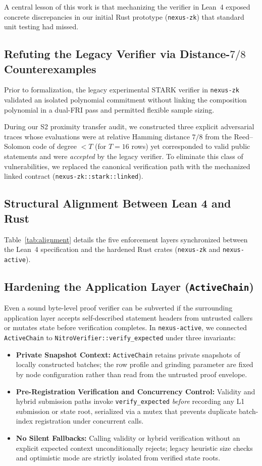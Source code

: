 \documentclass[conference]{IEEEtran}
\theoremstyle{definition}
\begin{document}
A central lesson of this work is that mechanizing the verifier in Lean~4 exposed concrete discrepancies in our initial Rust prototype (\texttt{nexus-zk}) that standard unit testing had missed.

\subsection{Refuting the Legacy Verifier via Distance-$7/8$ Counterexamples}
Prior to formalization, the legacy experimental STARK verifier in \texttt{nexus-zk} validated an isolated polynomial commitment without linking the composition polynomial in a dual-FRI pass and permitted flexible sample sizing.

During our S2 proximity transfer audit, we constructed three explicit adversarial traces whose evaluations were at relative Hamming distance $7/8$ from the Reed--Solomon code of degree $< T$ (for $T = 16$ rows) yet corresponded to valid public statements and were \emph{accepted} by the legacy verifier. To eliminate this class of vulnerabilities, we replaced the canonical verification path with the mechanized linked contract (\texttt{nexus-zk::stark::linked}).

\subsection{Structural Alignment Between Lean 4 and Rust}
Table~\ref{tab:alignment} details the five enforcement layers synchronized between the Lean~4 specification and the hardened Rust crates (\texttt{nexus-zk} and \texttt{nexus-active}).

\subsection{Hardening the Application Layer (\texttt{ActiveChain})}
Even a sound byte-level proof verifier can be subverted if the surrounding application layer accepts self-described statement headers from untrusted callers or mutates state before verification completes. In \texttt{nexus-active}, we connected \texttt{ActiveChain} to \texttt{NitroVerifier::verify\_expected} under three invariants:
\begin{itemize}
    \setlength{\itemsep}{2pt}
    \item \textbf{Private Snapshot Context:} \texttt{ActiveChain} retains private snapshots of locally constructed batches; the row profile and grinding parameter are fixed by node configuration rather than read from the untrusted proof envelope.
    \item \textbf{Pre-Registration Verification and Concurrency Control:} Validity and hybrid submission paths invoke \texttt{verify\_expected} \emph{before} recording any L1 submission or state root, serialized via a mutex that prevents duplicate batch-index registration under concurrent calls.
    \item \textbf{No Silent Fallbacks:} Calling validity or hybrid verification without an explicit expected context unconditionally rejects; legacy heuristic size checks and optimistic mode are strictly isolated from verified state roots.
\end{itemize}
\end{document}
